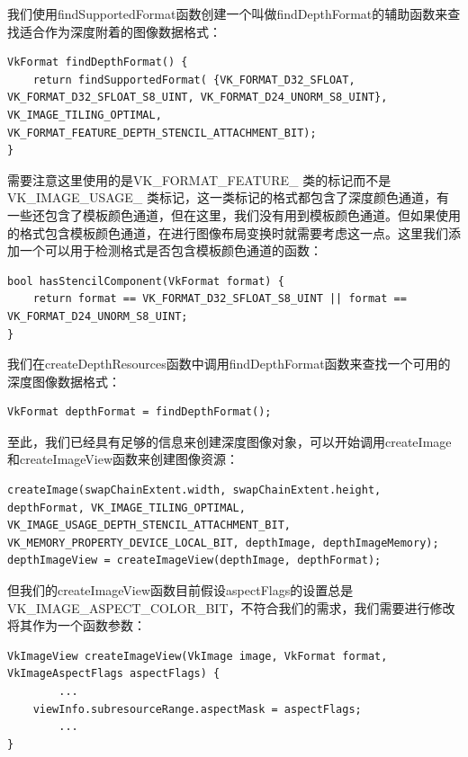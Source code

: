 \documentclass{ctexart}
\begin{document}
我们使用findSupportedFormat函数创建一个叫做findDepthFormat的辅助函数来查找适合作为深度附着的图像数据格式：

\begin{lstlisting}[language={[ANSI]C}]
VkFormat findDepthFormat() {
	return findSupportedFormat( {VK_FORMAT_D32_SFLOAT, VK_FORMAT_D32_SFLOAT_S8_UINT, VK_FORMAT_D24_UNORM_S8_UINT}, VK_IMAGE_TILING_OPTIMAL, VK_FORMAT_FEATURE_DEPTH_STENCIL_ATTACHMENT_BIT);
}
\end{lstlisting}

需要注意这里使用的是VK\_FORMAT\_FEATURE\_ 类的标记而不是VK\_IMAGE\_USAGE\_ 类标记，这一类标记的格式都包含了深度颜色通道，有一些还包含了模板颜色通道，但在这里，我们没有用到模板颜色通道。但如果使用的格式包含模板颜色通道，在进行图像布局变换时就需要考虑这一点。这里我们添加一个可以用于检测格式是否包含模板颜色通道的函数：

\begin{lstlisting}[language={[ANSI]C}]
bool hasStencilComponent(VkFormat format) {
	return format == VK_FORMAT_D32_SFLOAT_S8_UINT || format == VK_FORMAT_D24_UNORM_S8_UINT;
}
\end{lstlisting}

我们在createDepthResources函数中调用findDepthFormat函数来查找一个可用的深度图像数据格式：

\begin{lstlisting}[language={[ANSI]C}]
VkFormat depthFormat = findDepthFormat();
\end{lstlisting}

至此，我们已经具有足够的信息来创建深度图像对象，可以开始调用createImage和createImageView函数来创建图像资源：

\begin{lstlisting}[language={[ANSI]C}]
createImage(swapChainExtent.width, swapChainExtent.height, depthFormat, VK_IMAGE_TILING_OPTIMAL, VK_IMAGE_USAGE_DEPTH_STENCIL_ATTACHMENT_BIT, VK_MEMORY_PROPERTY_DEVICE_LOCAL_BIT, depthImage, depthImageMemory);
depthImageView = createImageView(depthImage, depthFormat);
\end{lstlisting}

但我们的createImageView函数目前假设aspectFlags的设置总是VK\_IMAGE\_ASPECT\_COLOR\_BIT，不符合我们的需求，我们需要进行修改将其作为一个函数参数：

\begin{lstlisting}[language={[ANSI]C}]
VkImageView createImageView(VkImage image, VkFormat format,
VkImageAspectFlags aspectFlags) {
		...
	viewInfo.subresourceRange.aspectMask = aspectFlags;
		...
}
\end{lstlisting}
\end{document}
